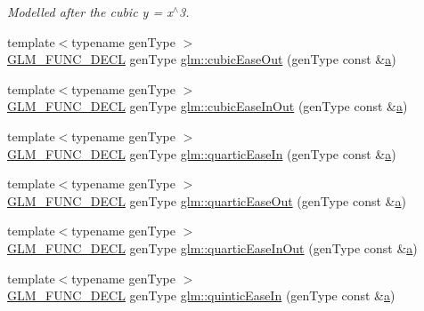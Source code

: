 \begin{DoxyCompactItemize}
\begin{DoxyCompactList}\small\item\em Modelled after the cubic y = x$^\wedge$3. \end{DoxyCompactList}\item 
{\footnotesize template$<$typename gen\+Type $>$ }\\\hyperlink{setup_8hpp_ab2d052de21a70539923e9bcbf6e83a51}{G\+L\+M\+\_\+\+F\+U\+N\+C\+\_\+\+D\+E\+CL} gen\+Type \hyperlink{group__gtx__easing_ga40d746385d8bcc5973f5bc6a2340ca91}{glm\+::cubic\+Ease\+Out} (gen\+Type const \&\hyperlink{_s_d_l__opengl__glext_8h_a3309789fc188587d666cda5ece79cf82}{a})
\item 
{\footnotesize template$<$typename gen\+Type $>$ }\\\hyperlink{setup_8hpp_ab2d052de21a70539923e9bcbf6e83a51}{G\+L\+M\+\_\+\+F\+U\+N\+C\+\_\+\+D\+E\+CL} gen\+Type \hyperlink{group__gtx__easing_ga55134072b42d75452189321d4a2ad91c}{glm\+::cubic\+Ease\+In\+Out} (gen\+Type const \&\hyperlink{_s_d_l__opengl__glext_8h_a3309789fc188587d666cda5ece79cf82}{a})
\item 
{\footnotesize template$<$typename gen\+Type $>$ }\\\hyperlink{setup_8hpp_ab2d052de21a70539923e9bcbf6e83a51}{G\+L\+M\+\_\+\+F\+U\+N\+C\+\_\+\+D\+E\+CL} gen\+Type \hyperlink{group__gtx__easing_ga808b41f14514f47dad5dcc69eb924afd}{glm\+::quartic\+Ease\+In} (gen\+Type const \&\hyperlink{_s_d_l__opengl__glext_8h_a3309789fc188587d666cda5ece79cf82}{a})
\item 
{\footnotesize template$<$typename gen\+Type $>$ }\\\hyperlink{setup_8hpp_ab2d052de21a70539923e9bcbf6e83a51}{G\+L\+M\+\_\+\+F\+U\+N\+C\+\_\+\+D\+E\+CL} gen\+Type \hyperlink{group__gtx__easing_ga4dfb33fa7664aa888eb647999d329b98}{glm\+::quartic\+Ease\+Out} (gen\+Type const \&\hyperlink{_s_d_l__opengl__glext_8h_a3309789fc188587d666cda5ece79cf82}{a})
\item 
{\footnotesize template$<$typename gen\+Type $>$ }\\\hyperlink{setup_8hpp_ab2d052de21a70539923e9bcbf6e83a51}{G\+L\+M\+\_\+\+F\+U\+N\+C\+\_\+\+D\+E\+CL} gen\+Type \hyperlink{group__gtx__easing_ga6d000f852de12b197e154f234b20c505}{glm\+::quartic\+Ease\+In\+Out} (gen\+Type const \&\hyperlink{_s_d_l__opengl__glext_8h_a3309789fc188587d666cda5ece79cf82}{a})
\item 
{\footnotesize template$<$typename gen\+Type $>$ }\\\hyperlink{setup_8hpp_ab2d052de21a70539923e9bcbf6e83a51}{G\+L\+M\+\_\+\+F\+U\+N\+C\+\_\+\+D\+E\+CL} gen\+Type \hyperlink{group__gtx__easing_ga097579d8e087dcf48037588140a21640}{glm\+::quintic\+Ease\+In} (gen\+Type const \&\hyperlink{_s_d_l__opengl__glext_8h_a3309789fc188587d666cda5ece79cf82}{a})

\end{DoxyCompactItemize}
